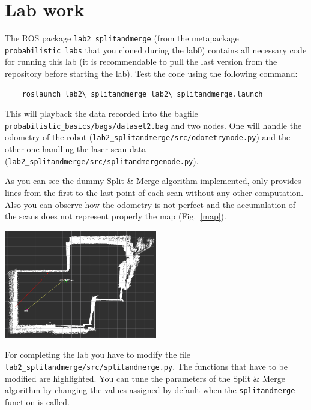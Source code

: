 \documentclass[a4paper,10pt]{article}
\begin{document}
\section{Lab work}

The ROS package \texttt{lab2\_splitandmerge} (from the metapackage \texttt{probabilistic\_labs} that you cloned during the lab0) contains all necessary code for running this lab (it is recommendable to pull the last version from the repository before starting the lab). Test the code using the following command:

\begin{verbatim}
    roslaunch lab2\_splitandmerge lab2\_splitandmerge.launch
\end{verbatim}

This will playback the data recorded into the bagfile \texttt{probabilistic\_basics/bags/dataset2.bag} and two nodes. One will handle the odometry of the robot (\texttt{lab2\_splitandmerge/src/odometrynode.py}) and the other one handling the laser scan data (\texttt{lab2\_splitandmerge/src/splitandmergenode.py}).

As you can see the dummy Split \& Merge algorithm implemented, only provides lines from the first to the last point of each scan without any other computation. Also you can observe how
the odometry is not perfect and the accumulation of the scans does not represent properly the map (Fig.~\ref{map}).

\begin{center}
	\includegraphics[width=0.50\textwidth]{lab2-scans}
	\label{map}
\end{center}

For completing the lab you have to modify the file \texttt{lab2\_splitandmerge/src/splitandmerge.py}. The functions that have to be modified are highlighted. You can tune the parameters of the Split \& Merge algorithm by changing the values assigned by default when the \texttt{splitandmerge} function is called.
\end{document}
